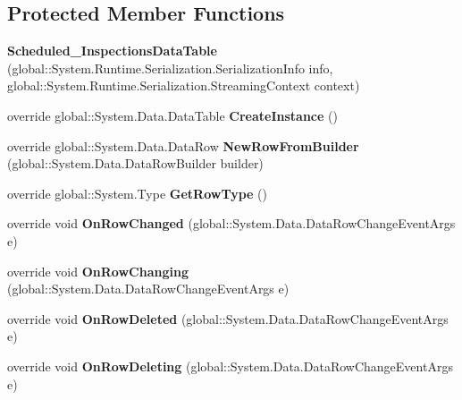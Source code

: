 \subsection*{Protected Member Functions}
\begin{DoxyCompactItemize}
\item 
\textbf{ Scheduled\+\_\+\+Inspections\+Data\+Table} (global\+::\+System.\+Runtime.\+Serialization.\+Serialization\+Info info, global\+::\+System.\+Runtime.\+Serialization.\+Streaming\+Context context)
\item 
override global\+::\+System.\+Data.\+Data\+Table \textbf{ Create\+Instance} ()
\item 
override global\+::\+System.\+Data.\+Data\+Row \textbf{ New\+Row\+From\+Builder} (global\+::\+System.\+Data.\+Data\+Row\+Builder builder)
\item 
override global\+::\+System.\+Type \textbf{ Get\+Row\+Type} ()
\item 
override void \textbf{ On\+Row\+Changed} (global\+::\+System.\+Data.\+Data\+Row\+Change\+Event\+Args e)
\item 
override void \textbf{ On\+Row\+Changing} (global\+::\+System.\+Data.\+Data\+Row\+Change\+Event\+Args e)
\item 
override void \textbf{ On\+Row\+Deleted} (global\+::\+System.\+Data.\+Data\+Row\+Change\+Event\+Args e)
\item 
override void \textbf{ On\+Row\+Deleting} (global\+::\+System.\+Data.\+Data\+Row\+Change\+Event\+Args e)
\end{DoxyCompactItemize}
